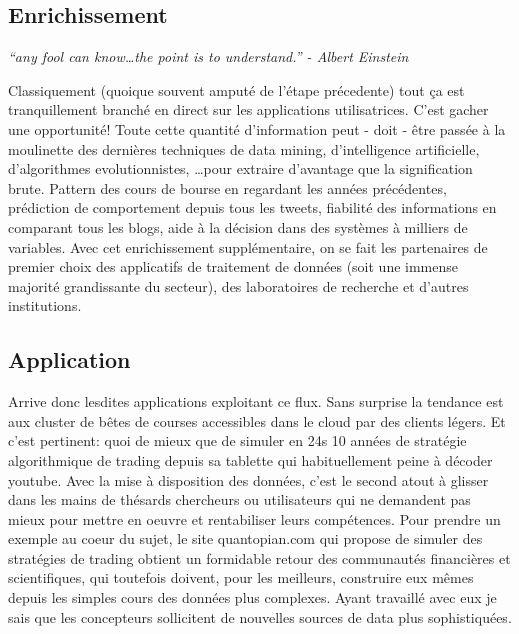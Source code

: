 \subsection{Enrichissement}
\textit{``any fool can know\ldots the point is to understand.'' - Albert
Einstein}\newline


Classiquement (quoique souvent amputé de l'étape précedente) tout ça est
tranquillement branché en direct sur les applications utilisatrices.
C'est gacher une opportunité! Toute cette quantité d'information peut
- doit - être passée à la moulinette des dernières techniques de data
mining, d'intelligence artificielle, d'algorithmes evolutionnistes,
\ldots pour extraire d'avantage que la signification brute. Pattern des
cours de bourse en regardant les années précédentes, prédiction de
comportement depuis tous les tweets, fiabilité des informations en comparant tous les
blogs, aide à la décision dans des systèmes à milliers de
variables.\newline
Avec cet enrichissement supplémentaire, on se fait les partenaires de
premier choix des applicatifs de traitement de données (soit une immense
majorité grandissante du secteur), des laboratoires
de recherche et d'autres institutions.


\subsection{Application}
        Arrive donc lesdites applications exploitant ce flux. Sans surprise la
tendance est aux cluster de bêtes de courses accessibles dans le cloud par
des clients légers. Et c'est pertinent: quoi de mieux que de simuler en 24s
10 années de stratégie algorithmique de trading depuis sa tablette qui
habituellement peine à décoder youtube. Avec la mise à disposition des
données, c'est le second atout à glisser dans les mains de thésards
chercheurs ou utilisateurs qui ne demandent pas mieux pour mettre en oeuvre
et rentabiliser leurs compétences.\newline
Pour prendre un exemple au coeur du sujet, le site quantopian.com qui
propose de simuler des stratégies de trading obtient un formidable retour
des communautés financières et scientifiques, qui toutefois doivent, pour
les meilleurs, construire eux mêmes depuis les simples cours des
données plus complexes. Ayant travaillé avec eux je sais que les
concepteurs sollicitent de nouvelles sources de data plus sophistiquées.



